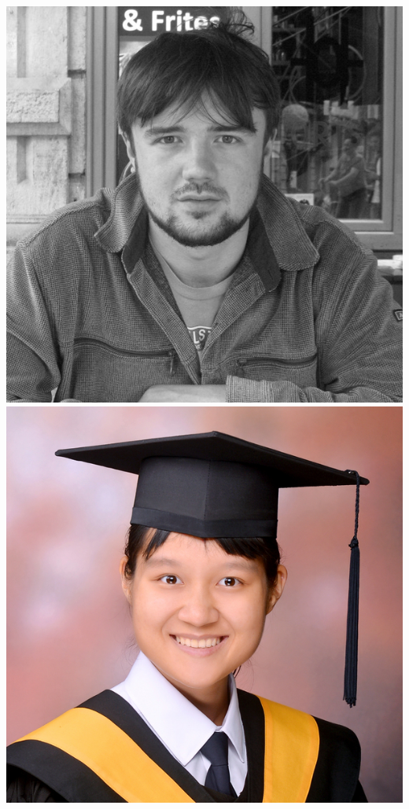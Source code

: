 \documentclass[aspectratio=169]{beamer}
\begin{document}
\begin{frame}
{        \includegraphics[width=0.10\textheight]{figures/students/sam_leeney.jpg}%
        \includegraphics[width=0.10\textheight]{figures/students/wei-ning_deng.jpg}%
}
\end{frame}
\end{document}
